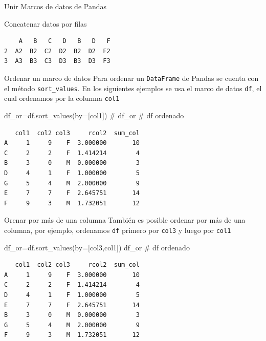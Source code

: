\documentclass[
  ignorenonframetext,
  aspectratio=169,
  spanish,
]{beamer}
\newenvironment{Shaded}{\begin{snugshade}}{\end{snugshade}}
\newcommand{\CommentTok}[1]{\textcolor[rgb]{0.37,0.37,0.37}{#1}}
\newcommand{\NormalTok}[1]{\textcolor[rgb]{0.00,0.23,0.31}{#1}}
\newcommand{\OperatorTok}[1]{\textcolor[rgb]{0.37,0.37,0.37}{#1}}
\newcommand{\StringTok}[1]{\textcolor[rgb]{0.13,0.47,0.30}{#1}}
\begin{document}
\begin{frame}[fragile]{Unir Marcos de datos de Pandas}
\begin{block}{Concatenar datos por filas}
\begin{verbatim}
    A   B   C   D   B   D   F
2  A2  B2  C2  D2  B2  D2  F2
3  A3  B3  C3  D3  B3  D3  F3
\end{verbatim}
\end{block}

\begin{block}{Ordenar un marco de datos}
\label{ordenar-un-marco-de-datos}
Para ordenar un \texttt{DataFrame} de Pandas se cuenta con el método
 \texttt{sort\_values}. En
los siguientes ejemplos se usa el marco de datos \texttt{df}, el cual
ordenamos por la columna \texttt{col1}

\begin{Shaded}
\begin{Highlighting}[]
\NormalTok{df\_or}\OperatorTok{=}\NormalTok{df.sort\_values(by}\OperatorTok{=}\NormalTok{[}\StringTok{\textquotesingle{}col1\textquotesingle{}}\NormalTok{]) }\CommentTok{\#  }
\NormalTok{df\_or }\CommentTok{\# df ordenado  }
\end{Highlighting}
\end{Shaded}

\begin{verbatim}
   col1  col2 col3     rcol2  sum_col
A     1     9    F  3.000000       10
C     2     2    F  1.414214        4
B     3     0    M  0.000000        3
D     4     1    F  1.000000        5
G     5     4    M  2.000000        9
E     7     7    F  2.645751       14
F     9     3    M  1.732051       12
\end{verbatim}
\end{block}

\begin{block}{Orenar por más de una columna}
\label{orenar-por-muxe1s-de-una-columna}
También es posible ordenar por más de una columna, por ejemplo,
ordenamos \texttt{df} primero por \texttt{col3} y luego por
\texttt{col1}

\begin{Shaded}
\begin{Highlighting}[]
\NormalTok{df\_or}\OperatorTok{=}\NormalTok{df.sort\_values(by}\OperatorTok{=}\NormalTok{[}\StringTok{\textquotesingle{}col3\textquotesingle{}}\NormalTok{,}\StringTok{\textquotesingle{}col1\textquotesingle{}}\NormalTok{])}
\NormalTok{df\_or }\CommentTok{\# df ordenado }
\end{Highlighting}
\end{Shaded}

\begin{verbatim}
   col1  col2 col3     rcol2  sum_col
A     1     9    F  3.000000       10
C     2     2    F  1.414214        4
D     4     1    F  1.000000        5
E     7     7    F  2.645751       14
B     3     0    M  0.000000        3
G     5     4    M  2.000000        9
F     9     3    M  1.732051       12
\end{verbatim}
\end{block}


\end{frame}
\end{document}
